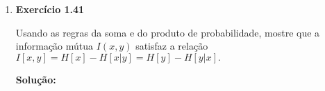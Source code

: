 \begin{enumerate}
\item \textbf{Exercício 1.41} \par

Usando as regras da soma e do produto de probabilidade, mostre que a informação mútua $I(x, y)$ satisfaz a relação $I[x,y]=H[x]-H[x|y]=H[y]-H[y|x].$
\newline \par
\textbf{Solução:}














\end{enumerate}